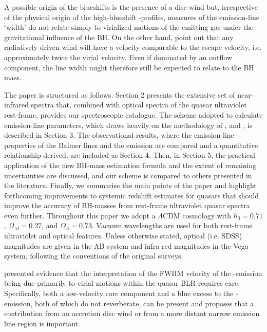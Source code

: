 A possible origin of the blueshifts is the presence of a disc-wind \citep[see][for recent papers]{gallagher15, higginbottom15} but, irrespective of the physical origin of the high-blueshift -profiles, measures of the emission-line `width' do not relate simply to virialized motions of the emitting gas under the gravitational influence of the BH. 
On the other hand, \citet{denney13} point out that any radiatively driven wind will have a velocity comparable to the escape velocity, i.e. approximately twice the virial velocity.
Even if dominated by an outflow component, the  line width might therefore still be expected to relate to the BH mass. 











The paper is structured as follows. Section 2 presents the extensive set of near-infrared spectra that, combined with optical spectra of the quasar ultraviolet rest-frame, provides our spectroscopic
catalogue. 
The scheme adopted to calculate emission-line parameters, which draws heavily on the methodology of \citet{shen11}, \citet{shen12} and \citet{shen16a}, is described in Section 3. 
The observational results, where the emission-line properties of the Balmer lines and the  emission are compared and a quantitative relationship derived, are included as
Section 4. 
Then, in Section 5, the practical application of the new BH-mass estimation formula and the extent of remaining uncertainties are discussed, and our scheme is compared to others presented in the literature. 
Finally, we summarise the main points of the paper and highlight forthcoming improvements to systemic redshift estimates for quasars that should improve the accuracy of BH-masses from rest-frame ultraviolet quasar spectra even further.
Throughout this paper we adopt a $\Lambda$CDM cosmology with $h_0=0.71$, $\Omega_M=0.27$, and $\Omega_\Lambda=0.73$. 
Vacuum wavelengths are used for both rest-frame ultraviolet and optical features.
Unless otherwise stated, optical (i.e. SDSS) magnitudes are given in the AB system and infra-red magnitudes in the Vega system, following the conventions of the original surveys. 


\citet{denney12} presented evidence that the interpretation of the FWHM velocity of the -emission being due primarily to virial motions within the quasar BLR requires care.  
Specifically, both a low-velocity core component and a blue excess to the -emission, both of which do not reverberate, can be present and \citet{denney12} proposes that a contribution from an accretion disc wind or from a more distant narrow emission line region is important.



